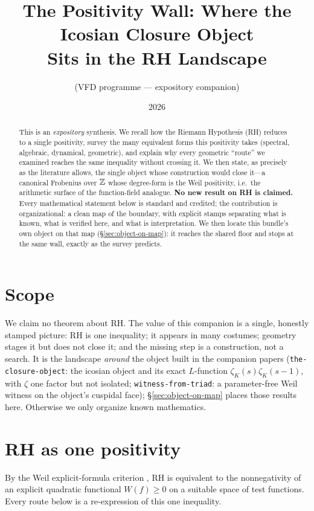\documentclass[11pt]{article}
\title{The Positivity Wall: Where the Icosian Closure Object\\ Sits in the RH Landscape}
\author{(VFD programme --- expository companion)}
\date{2026}
\newcommand{\zetaK}{\zeta_{K}}\newcommand{\F}{\mathbb{F}}
\begin{document}
\maketitle

\begin{abstract}
This is an \emph{expository} synthesis. We recall how the Riemann Hypothesis (RH)
reduces to a single positivity, survey the many equivalent forms this positivity
takes (spectral, algebraic, dynamical, geometric), and explain why every geometric
``route'' we examined reaches the same inequality without crossing it. We then state,
as precisely as the literature allows, the single object whose construction would
close it---a canonical Frobenius over $\mathbb{Z}$ whose degree-form is the Weil positivity,
i.e.\ the arithmetic surface of the function-field analogue. \textbf{No new result on
RH is claimed.} Every mathematical statement below is standard and credited; the
contribution is organizational: a clean map of the boundary, with explicit stamps
separating what is known, what is verified here, and what is interpretation. We then
locate this bundle's own object on that map (\S\ref{sec:object-on-map}): it reaches the
shared floor and stops at the same wall, exactly as the survey predicts.
\end{abstract}

\section{Scope}
We claim no theorem about RH. The value of this companion is a single, honestly stamped
picture: RH is one inequality; it appears in many costumes; geometry stages it but
does not close it; and the missing step is a construction, not a search. It is the
landscape \emph{around} the object built in the companion papers
(\texttt{the-closure-object}: the icosian object and its exact $L$-function
$\zetaK(s)\zetaK(s-1)$, with $\zeta$ one factor but not isolated;
\texttt{witness-from-triad}: a parameter-free Weil witness on the object's cuspidal
face); \S\ref{sec:object-on-map} places those results here. Otherwise we only organize
known mathematics.

\section{RH as one positivity}
By the Weil explicit-formula criterion \cite{Weil}, RH is equivalent to the
nonnegativity of an explicit quadratic functional $W(f)\ge 0$ on a suitable space of
test functions. Every route below is a re-expression of this one inequality.
\end{document}
